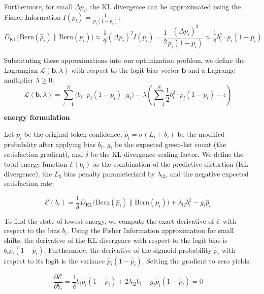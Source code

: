 Furthermore, for small $\Delta p_i$, the KL divergence can be approximated using the Fisher Information $I(p_i) = \frac{1}{p_i(1-p_i)}$:
\begin{equation}
D_{\text{KL}}\big(\text{Bern}(\hat{p}_i) \parallel \text{Bern}(p_i)\big) \approx \frac{1}{2} (\Delta p_i)^2 I(p_i) = \frac{1}{2} \frac{(\Delta p_i)^2}{p_i(1-p_i)} \approx \frac{1}{2} b_i^2 \cdot p_i(1-p_i)
\end{equation}

Substituting these approximations into our optimization problem, we define the Lagrangian $\mathcal{L}(\mathbf{b}, \lambda)$ with respect to the logit bias vector $\mathbf{b}$ and a Lagrange multiplier $\lambda \geq 0$:
\begin{equation}
\mathcal{L}(\mathbf{b}, \lambda) = \sum_{i=1}^{N} \Big( b_i \cdot p_i(1-p_i) \cdot g_i \Big) - \lambda \left( \sum_{i=1}^{N} \frac{1}{2} b_i^2 \cdot p_i(1-p_i) - \epsilon \right)
\end{equation}

\textbf{energy formulation}

Let $p_i$ be the original token confidence, $\hat{p}_i = \sigma(L_i + b_i)$ be the modified probability after applying bias $b_i$, $g_i$ be the expected green-list count (the satisfaction gradient), and $\delta$ be the KL-divergence scaling factor. We define the total energy function $\mathcal{E}(b_i)$ as the combination of the predictive distortion (KL divergence), the $L_2$ bias penalty parameterized by $\lambda_{\text{l2}}$, and the negative expected satisfaction rate:

\begin{equation}
\mathcal{E}(b_i) = \frac{1}{\delta} D_{\text{KL}}\big(\text{Bern}(\hat{p}_i) \parallel \text{Bern}(p_i)\big) + \lambda_{\text{l2}} b_i^2 - g_i \hat{p}_i
\end{equation}

To find the state of lowest energy, we compute the exact derivative of $\mathcal{E}$ with respect to the bias $b_i$. Using the Fisher Information approximation for small shifts, the derivative of the KL divergence with respect to the logit bias is $b_i \hat{p}_i(1-\hat{p}_i)$. Furthermore, the derivative of the sigmoid probability $\hat{p}_i$ with respect to its logit is the variance $\hat{p}_i(1-\hat{p}_i)$. Setting the gradient to zero yields:

\begin{equation}
\frac{\partial \mathcal{E}}{\partial b_i} = \frac{1}{\delta} b_i \hat{p}_i(1-\hat{p}_i) + 2\lambda_{\text{l2}} b_i - g_i \hat{p}_i(1-\hat{p}_i) = 0
\end{equation}


